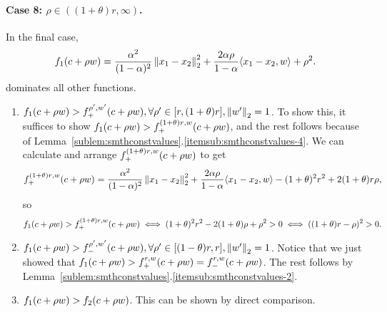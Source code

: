\paragraph{Case 8: $\rho \in ((1+\theta)r, \infty)$.}
In the final case, 
\begin{equation*}
	f_{1}(c+\rho w)
	= \frac{\alpha^2}{(1-\alpha)^2} \left\|{x_1-x_2}\right\|_2^2
	+ \frac{2\alpha\rho}{1-\alpha} \langle x_1-x_2, w \rangle
	+ \rho^2.
\end{equation*}
dominates all other functions.
\begin{enumerate}
	\item $f_{1}(c+\rho w) > f_+^{{\rho'},{w'}}(c+\rho w), \forall \rho' \in [r,(1+\theta)r], \left\|{w'}\right\|_2 = 1$.
	To show this, it suffices to show $f_{1}(c+\rho w) > f_+^{{(1+\theta)r},{w}}(c+\rho w)$,
	and the rest follows because of Lemma~\ref{sublem:smthconstvalues}.\ref{itemsub:smthconstvalues-4}.
	We can calculate and arrange $f_+^{{(1+\theta)r},{w}}(c+\rho w)$ to get
	\begin{equation*}
		f_+^{{(1+\theta)r},{w}}(c+\rho w) 
		= \frac{\alpha^2}{(1-\alpha)^2} \left\|{x_1-x_2}\right\|_2^2
		+ \frac{2\alpha\rho}{1-\alpha} \langle x_1-x_2, w \rangle
		- (1+\theta)^2 r^2 + 2(1+\theta)r \rho,
	\end{equation*}
	so 
	\begin{equation*}
		f_{1}(c+\rho w) > f_+^{{(1+\theta)r},{w}}(c+\rho w)
		\iff (1+\theta)^2 r^2 - 2(1+\theta) \rho + \rho^2 > 0
		\iff ((1+\theta)r-\rho)^2 > 0.
	\end{equation*}
	\item $f_{1}(c+\rho w) > f_-^{{\rho'},{w'}}(c+\rho w), \forall \rho' \in [(1-\theta)r,r], \left\|{w'}\right\|_2 = 1$.
	Notice that we just showed that 
	$f_{1}(c+\rho w) > f_+^{{r},{w}}(c+\rho w) = f_-^{{r},{w}}(c+\rho w)$.
	The rest follows by Lemma~\ref{sublem:smthconstvalues}.\ref{itemsub:smthconstvalues-2}.
	\item $f_{1}(c+\rho w) > f_{2}(c+\rho w)$. This can be shown by direct comparison.
\end{enumerate}

